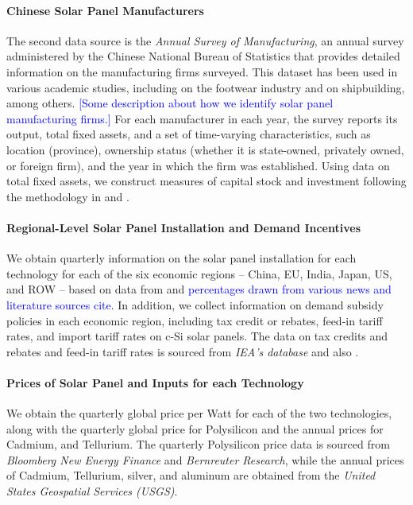\documentclass[12pt, letter]{article}
\begin{document}
\paragraph{Chinese Solar Panel Manufacturers}
The second data source is the \textit{Annual Survey of Manufacturing}, an annual survey administered by the Chinese National Bureau of Statistics that provides detailed information on the manufacturing firms surveyed. This dataset has been used in various academic studies, including \citet{roberts2018role} on the footwear industry and \citet{barwick2025industrial} on shipbuilding, among others. \textcolor{blue}{[Some description about how we identify solar panel manufacturing firms.]} For each manufacturer in each year, the survey reports its output, total fixed assets, and a set of time-varying characteristics, such as location (province), ownership status (whether it is state-owned, privately owned, or foreign firm), and the year in which the firm was established.  Using data on total fixed assets, we construct measures of capital stock and investment following the methodology in \citet{brandt2012creative} and \citet{barwick2025industrial}.

\paragraph{Regional-Level Solar Panel Installation and Demand Incentives}
We obtain quarterly information on the solar panel installation for each technology for each of the six economic regions -- China, EU, India, Japan, US, and ROW -- based on data from \cite{OWID_solar_pv_capacity_2025} and \textcolor{blue}{percentages drawn from various news and literature sources cite}. In addition, we collect information on demand subsidy policies in each economic region, including tax credit or rebates, feed-in tariff rates, and import tariff rates on c-Si solar panels. The data on tax credits and rebates and feed-in tariff rates is sourced from \textit{IEA's database} and also \cite{gerarden2023demanding}.

\paragraph{Prices of Solar Panel and Inputs for each Technology}
We obtain the quarterly global price per Watt for each of the two technologies, along with the quarterly global price for Polysilicon and the annual prices for Cadmium, and Tellurium. The quarterly Polysilicon price data is sourced from \textit{Bloomberg New Energy Finance} and \textit{Bernreuter Research}, while the annual prices of Cadmium, Tellurium, silver, and aluminum are obtained from the \textit{United States Geospatial Services (USGS)}. 
\end{document}
